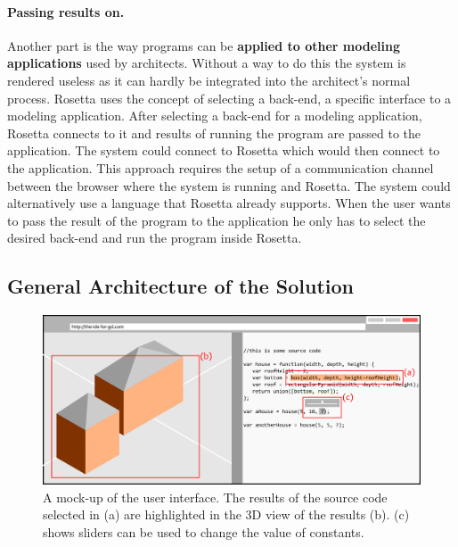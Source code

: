 \documentclass{./llncs2e/llncs}
\begin{document}
	\paragraph{Passing results on.}
	Another part is the way programs can be \textbf{applied to other modeling applications} used by architects.
	Without a way to do this the system is rendered useless as it can hardly be integrated into the architect's normal process. 
	Rosetta uses the concept of selecting a back-end, a specific interface to a modeling application. 
	After selecting a back-end for a modeling application, Rosetta connects to it and results of running the program are passed to the application. 
	The system could connect to Rosetta which would then connect to the application. 
	This approach requires the setup of a communication channel between the browser where the system is running and Rosetta. 
	The system could alternatively use a language that Rosetta already supports. 
	When the user wants to pass the result of the program to the application he only has to select the desired back-end and run the program inside Rosetta.


\subsection{General Architecture of the Solution}
	
	\begin{figure}
		\centering
		\includegraphics[width=1.0\textwidth]{img/ui_mock}
		\caption{A mock-up of the user interface. The results of the source code selected in (a) are highlighted in the 3D view of the results (b). (c) shows sliders can be used to change the value of constants.}
		\label{fig:ui:mock}
	\end{figure}
	
\end{document}
